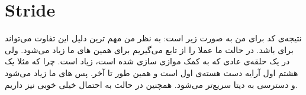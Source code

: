 \section{Stride}
نتیجه‌ی کد برای من به صورت زیر است:
به نظر من مهم ترین دلیل این تفاوت می‌تواند برای
باشد. در حالت
ما عملا
را از تابع می‌گیریم برای همین
های
ما زیاد می‌شود. ولی در یک حلقه‌ی عادی
که به کمک
موازی سازی شده است،‌
زیاد است. چرا که مثلا یک هشتم اول آرایه دست هسته‌ی اول
است و همین طور تا آخر. پس
های
ما زیاد می‌شود و دسترسی به دیتا سریع‌تر می‌شود. همچنین در حالت
به احتمال خیلی خوبی
نیز داریم.